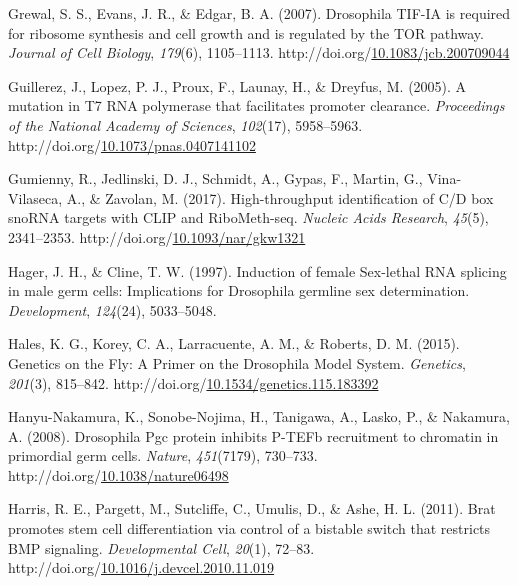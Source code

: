 \documentclass[12pt,oneside]{reedthesis}
\newlength{\cslhangindent}
\newenvironment{CSLReferences}[2] %
 {%
  \setlength{\parindent}{0pt}
  \ifodd #1 \everypar{\setlength{\hangindent}{\cslhangindent}}\ignorespaces\fi
  \ifnum #2 > 0
  \setlength{\parskip}{#2\baselineskip}
  \fi
 }%
 {}
\begin{document}
\begin{CSLReferences}{1}{0}
\leavevmode{}%
Grewal, S. S., Evans, J. R., \& Edgar, B. A. (2007). Drosophila {TIF}-{IA} is required for ribosome synthesis and cell growth and is regulated by the {TOR} pathway. \emph{Journal of Cell Biology}, \emph{179}(6), 1105--1113. http://doi.org/\href{https://doi.org/10.1083/jcb.200709044}{10.1083/jcb.200709044}

\leavevmode{}%
Guillerez, J., Lopez, P. J., Proux, F., Launay, H., \& Dreyfus, M. (2005). A mutation in {T7 RNA} polymerase that facilitates promoter clearance. \emph{Proceedings of the National Academy of Sciences}, \emph{102}(17), 5958--5963. http://doi.org/\href{https://doi.org/10.1073/pnas.0407141102}{10.1073/pnas.0407141102}

\leavevmode{}%
Gumienny, R., Jedlinski, D. J., Schmidt, A., Gypas, F., Martin, G., Vina-Vilaseca, A., \& Zavolan, M. (2017). High-throughput identification of {C}/{D} box {snoRNA} targets with {CLIP} and {RiboMeth}-seq. \emph{Nucleic Acids Research}, \emph{45}(5), 2341--2353. http://doi.org/\href{https://doi.org/10.1093/nar/gkw1321}{10.1093/nar/gkw1321}

\leavevmode{}%
Hager, J. H., \& Cline, T. W. (1997). Induction of female {Sex}-lethal {RNA} splicing in male germ cells: Implications for {Drosophila} germline sex determination. \emph{Development}, \emph{124}(24), 5033--5048.

\leavevmode{}%
Hales, K. G., Korey, C. A., Larracuente, A. M., \& Roberts, D. M. (2015). Genetics on the {Fly}: {A Primer} on the {Drosophila Model System}. \emph{Genetics}, \emph{201}(3), 815--842. http://doi.org/\href{https://doi.org/10.1534/genetics.115.183392}{10.1534/genetics.115.183392}

\leavevmode{}%
Hanyu-Nakamura, K., Sonobe-Nojima, H., Tanigawa, A., Lasko, P., \& Nakamura, A. (2008). Drosophila {Pgc} protein inhibits {P}-{TEFb} recruitment to chromatin in primordial germ cells. \emph{Nature}, \emph{451}(7179), 730--733. http://doi.org/\href{https://doi.org/10.1038/nature06498}{10.1038/nature06498}

\leavevmode{}%
Harris, R. E., Pargett, M., Sutcliffe, C., Umulis, D., \& Ashe, H. L. (2011). Brat promotes stem cell differentiation via control of a bistable switch that restricts {BMP} signaling. \emph{Developmental Cell}, \emph{20}(1), 72--83. http://doi.org/\href{https://doi.org/10.1016/j.devcel.2010.11.019}{10.1016/j.devcel.2010.11.019}


\end{CSLReferences}
\end{document}
